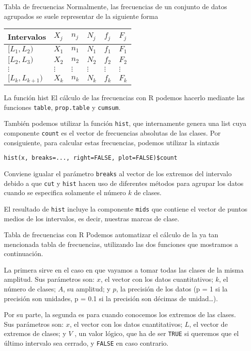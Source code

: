 \documentclass[
  ignorenonframetext,
]{beamer}
\begin{document}
\begin{frame}{Tabla de frecuencias}
\protect\hypertarget{tabla-de-frecuencias}{}
Normalmente, las frecuencias de un conjunto de datos agrupados se suele
representar de la siguiente forma

\begin{longtable}[]{@{}llllll@{}}
\toprule
Intervalos & \(X_j\) & \(n_j\) & \(N_j\) & \(f_j\) &
\(F_j\)\tabularnewline
\midrule
\endhead
\([L_1,L_2)\) & \(X_1\) & \(n_1\) & \(N_1\) & \(f_1\) &
\(F_1\)\tabularnewline
\([L_2,L_3)\) & \(X_2\) & \(n_2\) & \(N_2\) & \(f_2\) &
\(F_2\)\tabularnewline
\(\vdots\) & \(\vdots\) & \(\vdots\) & \(\vdots\) & \(\vdots\) &
\(\vdots\)\tabularnewline
\([L_k,L_{k+1})\) & \(X_k\) & \(n_k\) & \(N_k\) & \(f_k\) &
\(F_k\)\tabularnewline
\bottomrule
\end{longtable}
\end{frame}

\begin{frame}[fragile]{La función hist}
\protect\hypertarget{la-funciuxf3n-hist-1}{}
El cálculo de las frecuencias con R podemos hacerlo mediante las
funciones \texttt{table}, \texttt{prop.table} y \texttt{cumsum}.

También podemos utilizar la función \texttt{hist}, que internamente
genera una list cuya componente \texttt{count} es el vector de
frecuencias absolutas de las clases. Por consiguiente, para calcular
estas frecuencias, podemos utilizar la sintaxis

\texttt{hist(x,\ breaks=...,\ right=FALSE,\ plot=FALSE)\$count}

Conviene igualar el parámetro \texttt{breaks} al vector de los extremos
del intervalo debido a que \texttt{cut} y \texttt{hist} hacen uso de
diferentes métodos para agrupar los datos cuando se especifica solamente
el número \(k\) de clases.

El resultado de \texttt{hist} incluye la componente \texttt{mids} que
contiene el vector de puntos medios de los intervalos, es decir,
nuestras marcas de clase.
\end{frame}

\begin{frame}[fragile]{Tabla de frecuencias con R}
\protect\hypertarget{tabla-de-frecuencias-con-r}{}
Podemos automatizar el cálculo de la ya tan mencionada tabla de
frecuencias, utilizando las dos funciones que mostramos a continuación.

La primera sirve en el caso en que vayamos a tomar todas las clases de
la misma amplitud. Sus parámetros son: \(x\), el vector con los datos
cuantitativos; \(k\), el número de clases; \(A\), su amplitud; y \(p\),
la precisión de los datos (p = 1 si la precisión son unidades, p = 0.1
si la precisión son décimas de unidad\ldots).

Por su parte, la segunda es para cuando conocemos los extremos de las
clases. Sus parámetros son: \(x\), el vector con los datos
cuantitativos; \(L\), el vector de extremos de clases; y \(V\) , un
valor lógico, que ha de ser \texttt{TRUE} si queremos que el último
intervalo sea cerrado, y \texttt{FALSE} en caso contrario.
\end{frame}
\end{document}
